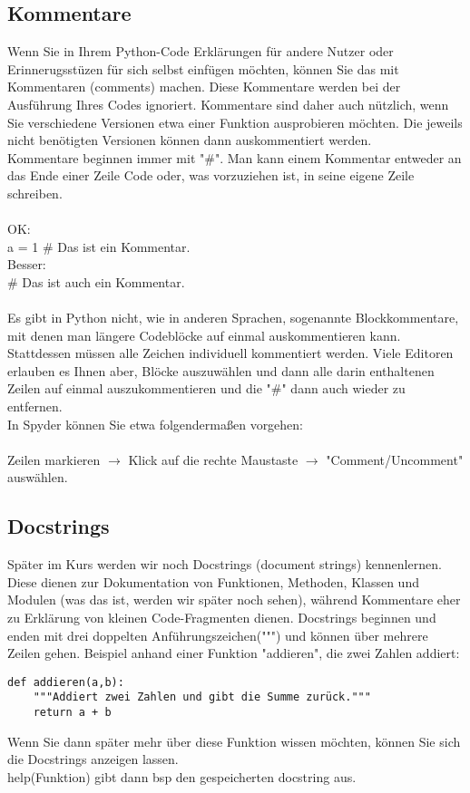 \documentclass{article}
\begin{document}
\subsection{Kommentare}
Wenn Sie in Ihrem Python-Code Erklärungen für andere Nutzer oder Erinnerugsstüzen für sich selbst einfügen möchten, können Sie das mit Kommentaren (comments) machen. Diese Kommentare werden bei der Ausführung Ihres Codes ignoriert. Kommentare sind daher auch nützlich, wenn Sie verschiedene Versionen etwa einer Funktion ausprobieren möchten. Die jeweils nicht benötigten Versionen können dann auskommentiert werden.\\
Kommentare beginnen immer mit "\#". Man kann einem Kommentar entweder an das Ende einer Zeile Code oder, was vorzuziehen ist, in seine eigene Zeile schreiben.\\\\
OK:\\
a = 1 # Das ist ein Kommentar.\\
Besser:\\
# Das ist auch ein Kommentar.\\\\
Es gibt in Python nicht, wie in anderen Sprachen, sogenannte Blockkommentare, mit denen man längere Codeblöcke auf einmal auskommentieren kann. Stattdessen müssen alle Zeichen individuell kommentiert werden. Viele Editoren erlauben es Ihnen aber, Blöcke auszuwählen und dann alle darin enthaltenen Zeilen auf einmal auszukommentieren und die "\#" dann auch wieder zu entfernen.\\
In Spyder können Sie etwa folgendermaßen vorgehen:\\\\
Zeilen markieren $\rightarrow$ Klick auf die rechte Maustaste $\rightarrow$ "Comment/Uncomment" auswählen.\\

\subsection{Docstrings}
Später im Kurs werden wir noch Docstrings (document strings) kennenlernen. Diese dienen zur Dokumentation von Funktionen, Methoden, Klassen und Modulen (was das ist, werden wir später noch sehen), während Kommentare eher zu Erklärung von kleinen Code-Fragmenten dienen. Docstrings beginnen und enden mit drei doppelten Anführungszeichen(""") und können über mehrere Zeilen gehen. Beispiel anhand einer Funktion "addieren", die zwei Zahlen addiert:\\
\begin{verbatim}
def addieren(a,b):
    """Addiert zwei Zahlen und gibt die Summe zurück."""
    return a + b
\end{verbatim}
Wenn Sie dann später mehr über diese Funktion wissen möchten, können Sie sich die Docstrings anzeigen lassen.\\
help(Funktion) gibt dann bsp den gespeicherten docstring aus.\\
\end{document}
